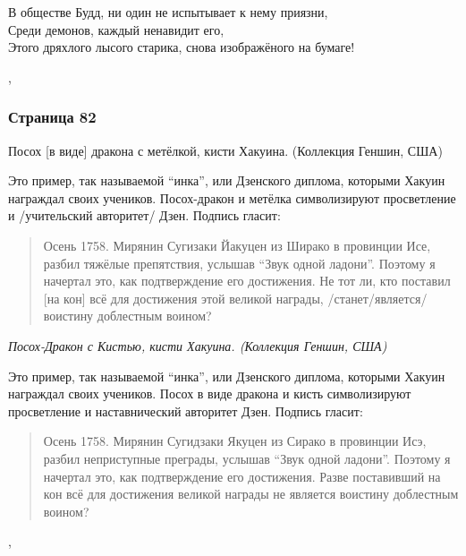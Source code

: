 \begin{ver}[3]
  \begin{verses}
    В обществе Будд, ни один не испытывает к нему приязни,\\
    Среди демонов, каждый ненавидит его,\\ 
    Этого дряхлого лысого старика, снова изображёного на бумаге!
  \end{verses}
\end{ver}
\sep

\subsubsection{Страница 82}
\begin{ver}
Посох [в виде] дракона с метёлкой, кисти Хакуина. (Коллекция Геншин, США)

Это пример, так называемой ``инка'', или Дзенского диплома, которыми
Хакуин награждал своих учеников. Посох-дракон и метёлка символизируют
просветление и /учительский авторитет/ Дзен.
Подпись гласит:

\begin{quote}
  Осень 1758. Мирянин Сугизаки Йакуцен из Ширако в провинции Исе,
  разбил тяжёлые препятствия, услышав ``Звук одной ладони''. Поэтому я
  начертал это, как подтверждение его достижения. Не тот
  ли, кто поставил [на кон] всё для достижения этой великой награды,
  /станет/является/ воистину доблестным воином? 
\end{quote}
\end{ver}

\begin{ver}[1]\it
Посох-Дракон с Кистью, кисти Хакуина. (Коллекция Геншин, США)
\end{ver}

\begin{ver}[1]
Это пример, так называемой ``инка'', или Дзенского диплома, которыми
Хакуин награждал своих учеников. Посох в виде дракона и кисть символизируют
просветление и наставнический авторитет Дзен.
Подпись гласит:
\end{ver}

\begin{ver}[1]
\begin{quote}
  Осень 1758. Мирянин Сугидзаки Якуцен из Сирако в провинции Исэ,
  разбил неприступные преграды, услышав ``Звук одной ладони''. Поэтому я
  начертал это, как подтверждение его достижения. 
  Разве поставивший на кон всё для достижения великой награды не
  является воистину доблестным воином? 
\end{quote}
\end{ver}
\sep


